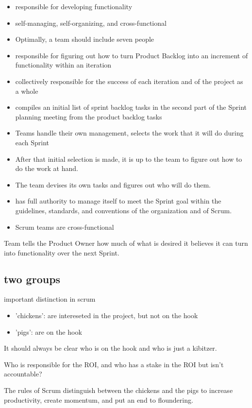 \begin{itemize}
  \item responsible for developing functionality
  \item self-managing, self-organizing, and cross-functional
  \item Optimally, a team should include seven people
  \item responsible for figuring out how to turn Product Backlog into an increment of functionality within an iteration
  \item collectively responsible for the success of each iteration and of the project as a whole
  \item compiles an initial list of sprint backlog tasks in the second part of the Sprint planning meeting from the product backlog tasks
  \item Teams handle their own management, selects the work that it will do during each Sprint
  \item After that initial selection is made, it is up to the team to figure out how to do the work at hand.
  \item The team devises its own tasks and figures out who will do them.
  \item has full authority to manage itself to meet the Sprint goal within the guidelines, standards, and conventions of the organization and of Scrum.
  \item Scrum teams are cross-functional
\end{itemize}

Team tells the Product Owner how much of what is desired it believes it can turn into functionality over the next Sprint.


\subsection{two groups}
important distinction in scrum
\begin{itemize}
  \item 'chickens': are intereseted in the project, but not on the hook
  \item 'pigs': are on the hook
\end{itemize}

It should always be clear who is on the hook and who is just a kibitzer.

Who is responsible for the ROI, and who has a stake in the ROI but isn’t accountable?

The rules of Scrum distinguish between the chickens and the pigs to increase productivity, create momentum, and put an end to floundering. 